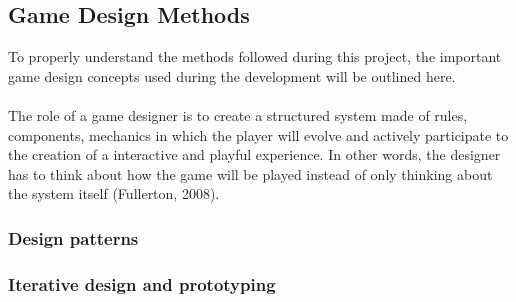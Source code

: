 \subsection{Game Design Methods}
To properly understand the methods followed during this project, the important game design concepts used during the development will be outlined here.
\\\\
The role of a game designer is to create a structured system made of rules, components, mechanics in which the player will evolve and actively participate to the creation of a interactive and playful experience. In other words, the designer has to think about how the game will be played instead of only thinking about the system itself (Fullerton, 2008). \cite{book:fullerton}
\subsubsection{Design patterns}
\subsubsection{Iterative design and prototyping}

